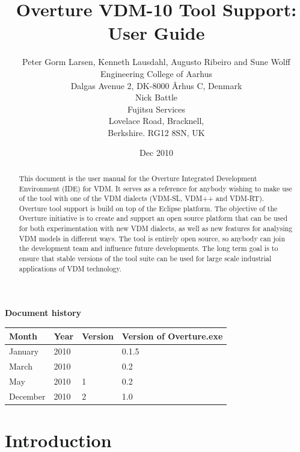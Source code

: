 \documentclass{overturerepchap}
\begin{document}
\title{Overture VDM-10 Tool Support: User Guide}
\author{Peter Gorm Larsen, Kenneth Lausdahl, Augusto Ribeiro and Sune Wolff \\ 
Engineering College of Aarhus\\
Dalgas Avenue 2, DK-8000 \AA{}rhus C, Denmark\\[3mm]
Nick Battle\\
Fujitsu Services\\
Lovelace Road, Bracknell, \\
Berkshire. RG12 8SN, UK}

\date{Dec 2010}


\maketitle


\textbf{Document history}

\begin{tabular}{|l|l|l|l|}\hline
Month   & Year & Version & Version of Overture.exe \\ \hline
January & 2010 &         & 0.1.5 \\ \hline
March   & 2010 &         & 0.2   \\ \hline
May     & 2010 & 1       & 0.2   \\ \hline
December& 2010 & 2       & 1.0   \\ \hline
\end{tabular}

\tableofcontents

\begin{abstract}
This document is the user manual for the Overture Integrated Development
Environment (IDE) for
VDM. It serves as a reference for anybody wishing to make use of
the tool with one of the VDM dialects (VDM-SL, VDM++ and VDM-RT).
Overture tool support is build on top of the Eclipse platform. The
objective of the Overture initiative is to create and support an open source
platform that can be used for both experimentation with new VDM dialects,
as well as new features for analysing VDM
models in different ways. The tool is entirely open source, so anybody
can join the development team and influence future
developments. The long term goal is to ensure that stable
versions of the tool suite can be used for large scale industrial
applications of VDM technology.
\end{abstract}

\chapter{Introduction}
\end{document}
